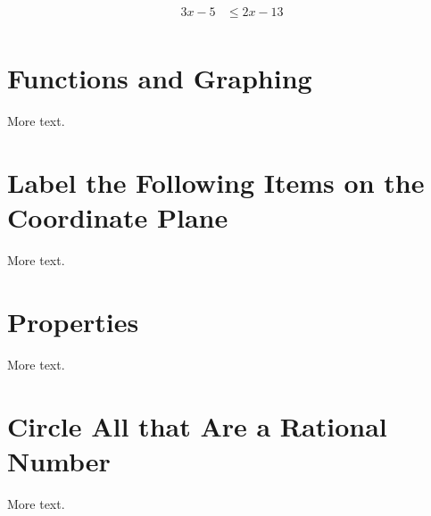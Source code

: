 \documentclass[11pt]{article} %
\begin{document}
\begin{align*}
3x - 5 &\leq 2x - 13 \\
\end{align*}

\section{Functions and Graphing}

More text.

\section{Label the Following Items on the Coordinate Plane}

More text.

\section{Properties}

More text.

\section{Circle All that Are a Rational Number}

More text.
\end{document}
